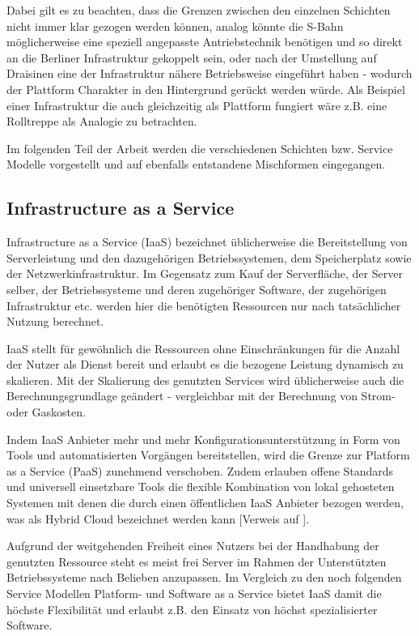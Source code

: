 \documentclass[journal]{IEEEtran}
\begin{document}
Dabei gilt es zu beachten, dass die Grenzen zwischen den einzelnen Schichten nicht immer klar gezogen werden können, analog könnte die S-Bahn möglicherweise eine speziell angepasste Antriebstechnik benötigen und so direkt an die Berliner Infrastruktur gekoppelt sein, oder nach der Umstellung auf Draisinen eine der Infrastruktur nähere Betriebsweise eingeführt haben - wodurch der Plattform Charakter in den Hintergrund gerückt werden würde. Als Beispiel einer Infrastruktur die auch gleichzeitig als Plattform fungiert wäre z.B. eine Rolltreppe als Analogie zu betrachten.

Im folgenden Teil der Arbeit werden die verschiedenen Schichten bzw. Service Modelle vorgestellt und auf ebenfalls entstandene Mischformen eingegangen.
 
\subsection{Infrastructure as a Service}
Infrastructure as a Service (IaaS) bezeichnet üblicherweise die Bereitstellung von Serverleistung und den dazugehörigen Betriebssystemen, dem Speicherplatz sowie der Netzwerkinfrastruktur. Im Gegensatz zum Kauf der Serverfläche, der Server selber, der Betriebssysteme und deren zugehöriger Software, der zugehörigen Infrastruktur etc. werden hier die benötigten Ressourcen nur nach tatsächlicher Nutzung berechnet.

IaaS stellt für gewöhnlich die Ressourcen ohne Einschränkungen für die Anzahl der Nutzer als Dienst bereit und erlaubt es die bezogene Leistung dynamisch zu skalieren. Mit der Skalierung des genutzten Services wird üblicherweise auch die Berechnungsgrundlage geändert - vergleichbar mit der Berechnung von Strom- oder Gaskosten.

Indem IaaS Anbieter mehr und mehr Konfigurationsunterstützung in Form von Tools und automatisierten Vorgängen bereitstellen, wird die Grenze zur Platform as a Service (PaaS) zunehmend verschoben. Zudem erlauben offene Standards und universell einsetzbare Tools die flexible Kombination von lokal gehosteten Systemen mit denen die durch einen öffentlichen IaaS Anbieter bezogen werden, was als Hybrid Cloud bezeichnet werden kann [Verweis auf ].

Aufgrund der weitgehenden Freiheit eines Nutzers bei der Handhabung der genutzten Ressource steht es meist frei Server im Rahmen der Unterstützten Betriebssysteme nach Belieben anzupassen. Im Vergleich zu den noch folgenden Service Modellen Platform- und Software as a Service bietet IaaS damit die höchste Flexibilität und erlaubt z.B. den Einsatz von höchst spezialisierter Software.
\end{document}
